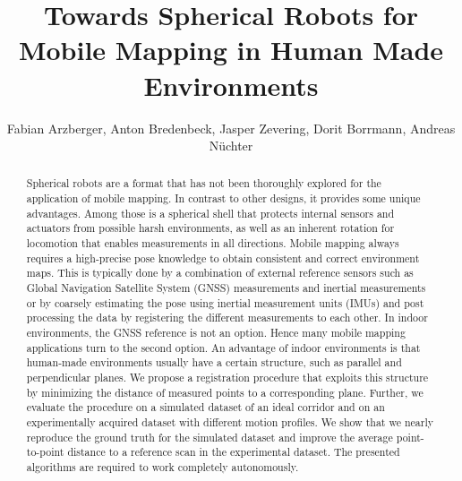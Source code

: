 \documentclass[5p]{elsarticle}
\begin{document}
\begin{frontmatter}

\title{Towards Spherical Robots for Mobile Mapping in Human Made Environments}

\author{Fabian Arzberger, Anton Bredenbeck, Jasper Zevering, Dorit Borrmann, Andreas Nüchter}
\address{Informatics VII: Robotics and Telematics,
Julius-Maximilians-University Würzburg, Germany\\
e-mail: dorit.borrmann@uni-wuerzburg.de}




\begin{abstract}
Spherical robots are a format that has not been thoroughly explored for the application of mobile mapping. 
In contrast to other designs, it provides some unique advantages. 
Among those is a spherical shell that protects internal sensors and actuators from possible harsh environments, as well as an inherent rotation for locomotion that enables measurements in all directions.
Mobile mapping always requires a high-precise pose knowledge to obtain consistent and correct environment maps. 
This is typically done by a combination of external reference sensors such as Global Navigation Satellite System (GNSS) measurements and inertial measurements or by coarsely estimating the pose using inertial measurement units (IMUs) and post processing the data by registering the different measurements to each other. 
In indoor environments, the GNSS reference is not an option.
Hence many mobile mapping applications turn to the second option.
An advantage of indoor environments is that human-made environments usually have a certain structure, such as parallel and perpendicular planes.
We propose a registration procedure that exploits this structure by minimizing the distance of measured points to a corresponding plane. 
Further, we evaluate the procedure on a simulated dataset of an ideal corridor and on an experimentally acquired dataset with different motion profiles. 
We show that we nearly reproduce the ground truth for the simulated dataset and improve the average point-to-point distance to a reference scan in the experimental dataset.
The presented algorithms are required to work completely autonomously.
\end{abstract}


\end{frontmatter}
\end{document}
